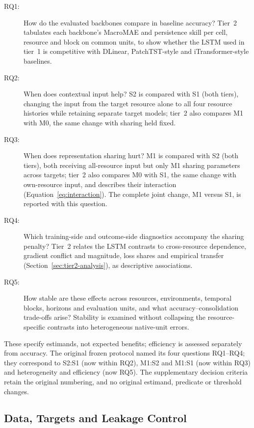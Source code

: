 \documentclass[5p,twocolumn]{elsarticle}
\begin{document}
\begin{description}
  \item[RQ1:] How do the evaluated backbones compare in baseline accuracy?
    Tier~2 tabulates each backbone's MacroMAE and persistence skill per cell,
    resource and block on common units, to show whether the LSTM used in
    tier~1 is competitive with DLinear, PatchTST-style and
    iTransformer-style baselines.
  \item[RQ2:] When does contextual input help? S2 is compared with S1 (both
    tiers), changing the input from the target resource alone to all four
    resource histories while retaining separate target models; tier~2 also
    compares M1 with M0, the same change with sharing held fixed.
  \item[RQ3:] When does representation sharing hurt? M1 is compared with S2
    (both tiers), both receiving all-resource input but only M1 sharing
    parameters across targets; tier~2 also compares M0 with S1, the same
    change with own-resource input, and describes their interaction
    (Equation~\ref{eq:interaction}). The complete joint change, M1 versus S1,
    is reported with this question.
  \item[RQ4:] Which training-side and outcome-side diagnostics accompany the
    sharing penalty? Tier~2 relates the LSTM contrasts to cross-resource
    dependence, gradient conflict and magnitude, loss shares and empirical
    transfer (Section~\ref{sec:tier2-analysis}), as descriptive associations.
  \item[RQ5:] How stable are these effects across resources, environments,
    temporal blocks, horizons and evaluation units, and what
    accuracy--consolidation trade-offs arise? Stability is examined without
    collapsing the resource-specific contrasts into heterogeneous native-unit
    errors.
\end{description}

These specify estimands, not expected benefits; efficiency is assessed
separately from accuracy. The original frozen protocol named its four
questions RQ1--RQ4; they correspond to S2:S1 (now within RQ2), M1:S2 and
M1:S1 (now within RQ3) and heterogeneity and efficiency (now RQ5). The
supplementary decision criteria retain the original numbering, and no
original estimand, predicate or threshold changes.

\subsection{Data, Targets and Leakage Control}
\label{sec:datasets}
\label{sec:preprocessing}
\label{sec:leakage-control}
\label{sec:population-restrictions}
\label{sec:replication-design}
\end{document}
